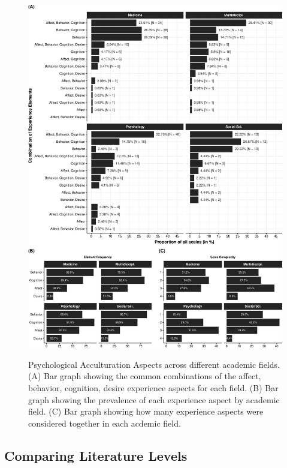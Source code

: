 \begin{figure}[h]
\centering
\caption{Psychological Acculturation Aspects across different academic fields. (A) Bar graph showing the common combinations of the affect, behavior, cognition, desire experience aspects for each field. (B) Bar graph showing the prevalence of each experience aspect by academic field. (C) Bar graph showing how many experience aspects were considered together in each acdemic field.}
\includegraphics[width=\textwidth]{Figures/FieldPlotFreq-1}
\label{fig:FieldPlotFreq}
\end{figure}

\color{blue}
\subsection{Comparing Literature Levels}
\color{black}

